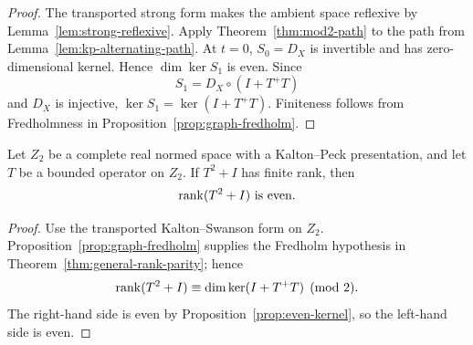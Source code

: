 \begin{proof}
The transported strong form makes the ambient space reflexive by
Lemma~\ref{lem:strong-reflexive}.  Apply Theorem~\ref{thm:mod2-path} to the path from
Lemma~\ref{lem:kp-alternating-path}.  At $t=0$, $S_0=D_X$ is invertible and has zero-dimensional
kernel.  Hence $\dim\ker S_1$ is even.  Since
\[
  S_1=D_X\circ(I+T^+T)
\]
and $D_X$ is injective, $\ker S_1=\ker(I+T^+T)$.  Finiteness follows from Fredholmness in
Proposition~\ref{prop:graph-fredholm}.
\end{proof}

\begin{theorem}\label{thm:z2-rank-parity}
Let $Z_2$ be a complete real normed space with a Kalton--Peck presentation, and let $T$ be a bounded
operator on $Z_2$.  If $T^2+I$ has finite rank, then
\[
  \operatorname{rank}(T^2+I)\text{ is even}.
\]
\leanok
\end{theorem}

\begin{proof}
Use the transported Kalton--Swanson form on $Z_2$.  Proposition~\ref{prop:graph-fredholm} supplies
the Fredholm hypothesis in Theorem~\ref{thm:general-rank-parity}; hence
\[
  \operatorname{rank}(T^2+I)\equiv\dim\ker(I+T^+T)\pmod2.
\]
The right-hand side is even by Proposition~\ref{prop:even-kernel}, so the left-hand side is even.
\end{proof}
